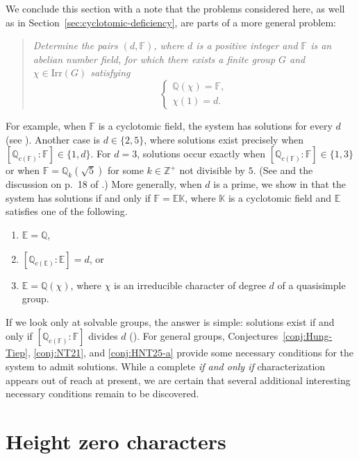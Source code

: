 \documentclass[12pt]{amsart}
\theoremstyle{definition}
\numberwithin{equation}{section}
\newcommand{\Irr}{{\mathrm {Irr}}}
\newcommand{\QQ}{{\mathbb Q}}
\newcommand{\ZZ}{{\mathbb Z}}
\newcommand{\EE}{{\mathbb E}}
\newcommand{\FF}{{\mathbb F}}
\begin{document}
We conclude this section with a note that the problems considered
here, as well as in Section~\ref{sec:cyclotomic-deficiency}, are
parts of a more general problem:
\begin{quote}
\emph{Determine the pairs $(d,\FF)$, where $d$ is a positive integer and
$\FF$ is an abelian number field, for which there exists a finite
group $G$ and $\chi\in\Irr(G)$ satisfying
\[
\begin{cases}
\QQ(\chi)=\FF,\\
\chi(1)=d.
\end{cases}
\]}
\end{quote}

For example, when $\FF$ is a cyclotomic field, the system has
solutions for every $d$ (see \cite[Lemma~2.1]{Hung-Tiep23}). Another
case is $d\in\{2,5\}$, where solutions exist precisely when
$[\QQ_{c(\FF)}:\FF]\in\{1,d\}$. For $d=3$, solutions occur exactly
when $[\QQ_{c(\FF)}:\FF]\in\{1,3\}$ or when $\FF=\QQ_k(\sqrt{5})$
for some $k\in\ZZ^+$ not divisible by $5$. (See
\cite[Theorem~1.1]{Hung-Tiep23} and the discussion on p.~18 of
\cite{HTZ}.) More generally, when $d$ is a prime, we show in
\cite[Theorem~D]{HTZ} that the system has solutions if and only if
$\FF=\EE \mathbb{K}$, where $\mathbb{K}$ is a cyclotomic field and
$\EE$ satisfies one of the following.
\begin{enumerate}
\item $\EE=\QQ$,

\item $[\QQ_{c(\EE)}:\EE]=d$, or

\item $\EE=\QQ(\chi)$, where $\chi$ is an irreducible character of degree $d$ of a
quasisimple group.
\end{enumerate}


If we look only at solvable groups, the answer is simple: solutions
exist if and only if $[\QQ_{c(\FF)}:\FF]$ divides $d$
(\cite[Theorem~2.2]{Hung-Tiep23}). For general groups,
Conjectures~\ref{conj:Hung-Tiep}, \ref{conj:NT21}, and
\ref{conj:HNT25-a} provide some necessary conditions for the system
to admit solutions. While a complete \emph{if and only if}
characterization appears out of reach at present, we are certain
that several additional interesting necessary conditions remain to
be discovered.


\section{Height zero characters}
\end{document}
